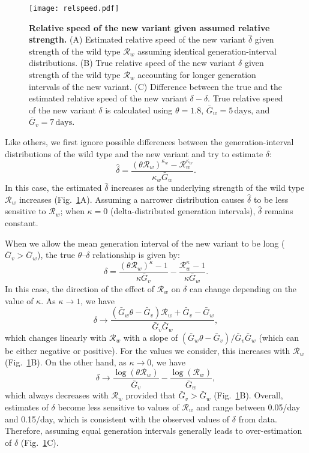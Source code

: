 \documentclass[12pt]{article}
\newcommand{\fref}[1]{Fig.~\ref{fig:#1}}
\newcommand{\RR}{\ensuremath{{\mathcal R}}\xspace}
\begin{document}
\begin{figure}[!th]
\texttt{[image: relspeed.pdf]}
\caption{
\textbf{Relative speed of the new variant given assumed relative strength.}
(A) Estimated relative speed of the new variant $\hat{\delta}$ given strength of the wild type $\RR_w$ assuming identical generation-interval distributions.
(B) True relative speed of the new variant $\delta$ given strength of the wild type $\RR_w$ accounting for longer generation intervals of the new variant.
(C) Difference between the true and the estimated relative speed of the new variant $\delta - \hat{\delta}$.
True relative speed of the new variant $\delta$ is calculated using $\theta=1.8$, $\bar{G}_w = 5\,\textrm{days}$, and $\bar{G}_v = 7\,\textrm{days}$.
}
\label{fig:relspeed}
\end{figure}

Like others, we first ignore possible differences between the generation-interval distributions of the wild type and the new variant and try to estimate $\delta$:
\begin{equation}
\hat{\delta} = \frac{(\theta \RR_w)^{\kappa_w} - \RR_w^{\kappa_w}}{\kappa_w \bar{G}_w}.
\end{equation}
In this case, the estimated $\hat{\delta}$ increases as the underlying strength of the wild type $\RR_w$ increases (\fref{relspeed}A).
Assuming a narrower distribution causes $\hat{\delta}$ to be less sensitive to $\RR_w$;
when $\kappa = 0$ (delta-distributed generation intervals), $\hat{\delta}$ remains constant.

When we allow the mean generation interval of the new variant to be long ($\bar{G}_v > \bar{G}_w$), the true $\theta$--$\delta$ relationship is given by:
\begin{equation}
\delta = \frac{(\theta \RR_w)^{\kappa} - 1}{\kappa \bar{G}_v} - \frac{\RR_w^{\kappa} - 1}{\kappa \bar{G}_w}.
\end{equation}
In this case, the direction of the effect of $\RR_w$ on $\delta$ can change depending on the value of $\kappa$.
As $\kappa \to 1$, we have
\begin{equation}
\delta \to \frac{(\bar{G}_w \theta - \bar{G}_v) \RR_w + \bar{G}_v - \bar{G}_w}{\bar{G}_v \bar{G}_w},
\end{equation}
which changes linearly with $\RR_w$ with a slope of $(\bar{G}_w \theta - \bar{G}_v)/\bar{G}_v \bar{G}_w$ (which can be either negative or positive).
For the values we consider, this increases with $\RR_w$ (\fref{relspeed}B).
On the other hand, as $\kappa \to 0$, we have
\begin{equation}
\delta \to \frac{\log(\theta \RR_w)}{\bar{G}_v} - \frac{\log(\RR_w)}{\bar{G}_w},
\end{equation}
which always decreases with $\RR_w$ provided that $\bar{G}_v > \bar{G}_w$ (\fref{relspeed}B).
Overall, estimates of $\delta$ become less sensitive to values of $\RR_w$ and range between 0.05/day and 0.15/day, which is consistent with the observed values of $\delta$ from data.
Therefore, assuming equal generation intervals generally leads to over-estimation of $\delta$ (\fref{relspeed}C).
\end{document}
